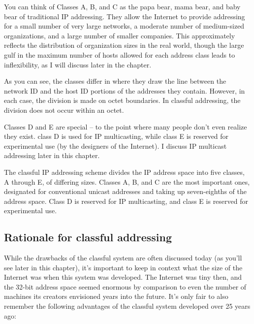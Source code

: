 You can think of Classes A, B, and C as the papa bear, mama bear, and baby bear of traditional IP addressing.
They allow the Internet to provide addressing for a small number of very
large networks, a moderate number of medium-sized organizations, and a
large number of smaller companies. This approximately reflects the
distribution of organization sizes in the real world, though the large
gulf in the maximum number of hosts allowed for each address class leads
to inflexibility, as I will discuss later in the chapter.

As you can see, the classes differ in where they draw the line between
the network ID and the host ID portions of the addresses they contain.
However, in each case, the division is made on octet boundaries. In
classful addressing, the division does not occur within an octet.

Classes D and E are special -- to the point where many people don't even realize they exist.
class D is used for IP multicasting, while class E is reserved for experimental use (by the designers of the Internet).
I discuss IP multicast addressing later in this chapter.


\begin{keyconcept}
The classful IP addressing scheme divides the IP address space into five classes, A through E, of differing sizes.
Classes A, B, and C are the most important ones, designated for conventional unicast addresses and taking up seven-eighths of the address space.
Class D is reserved for IP multicasting, and class E is reserved for experimental use.
\end{keyconcept}


\subsection{Rationale for classful addressing}

While the drawbacks of the classful system are often discussed today (as
you'll see later in this chapter), it's important to keep in context
what the size of the Internet was when this system was developed. The
Internet was tiny then, and the 32-bit address space seemed enormous by
comparison to even the number of machines its creators envisioned years
into the future. It's only fair to also remember the following
advantages of the classful system developed over 25 years ago:

